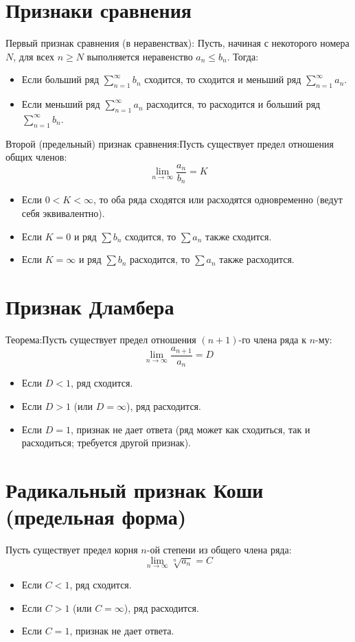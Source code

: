 \documentclass[14pt]{extreport}
\begin{document}
    \section{Признаки сравнения}
    Первый признак сравнения (в неравенствах):
Пусть, начиная с некоторого номера $N$, для всех $n \ge N$ выполняется неравенство $a_n \le b_n$. Тогда:

    \begin{itemize}
        \item Если больший ряд $\sum_{n=1}^{\infty} b_n$ сходится, то сходится и меньший ряд $\sum_{n=1}^{\infty} a_n$.
        \item Если меньший ряд $\sum_{n=1}^{\infty} a_n$ расходится, то расходится и больший ряд $\sum_{n=1}^{\infty} b_n$.
    \end{itemize}

    Второй (предельный) признак сравнения:Пусть существует предел отношения общих членов:$$\lim_{n \to \infty} \frac{a_n}{b_n} = K$$

    \begin{itemize}
        \item Если $0 < K < \infty$, то оба ряда сходятся или расходятся одновременно (ведут себя эквивалентно).
        \item Если $K = 0$ и ряд $\sum b_n$ сходится, то $\sum a_n$ также сходится.
        \item Если $K = \infty$ и ряд $\sum b_n$ расходится, то $\sum a_n$ также расходится.
    \end{itemize}

    \section{Признак Дламбера}
    Теорема:Пусть существует предел отношения $(n+1)$-го члена ряда к $n$-му:$$\lim_{n \to \infty} \frac{a_{n+1}}{a_n} = D$$

    \begin{itemize}
        \item Если $D < 1$, ряд сходится.
        \item Если $D > 1$ (или $D = \infty$), ряд расходится.
        \item Если $D = 1$, признак не дает ответа (ряд может как сходиться, так и расходиться; требуется другой признак).
    \end{itemize}

    \section{Радикальный признак Коши (предельная форма)}
    \begin{theorem}
        Пусть существует предел корня $n$-ой степени из общего члена ряда:$$\lim_{n \to \infty} \sqrt[n]{a_n} = C$$
        \begin{itemize}
            \item Если $C < 1$, ряд сходится.
            \item Если $C > 1$ (или $C = \infty$), ряд расходится.
            \item Если $C = 1$, признак не дает ответа.
        \end{itemize}
    \end{theorem}
\end{document}
